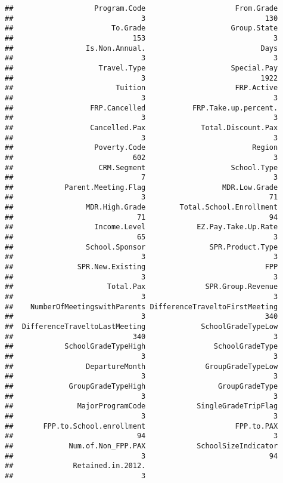 \documentclass[
]{article}
\begin{document}
\begin{verbatim}
##                   Program.Code                     From.Grade 
##                              3                            130 
##                       To.Grade                    Group.State 
##                            153                              3 
##                 Is.Non.Annual.                           Days 
##                              3                              3 
##                    Travel.Type                    Special.Pay 
##                              3                           1922 
##                        Tuition                     FRP.Active 
##                              3                              3 
##                  FRP.Cancelled           FRP.Take.up.percent. 
##                              3                              3 
##                  Cancelled.Pax             Total.Discount.Pax 
##                              3                              3 
##                   Poverty.Code                         Region 
##                            602                              3 
##                    CRM.Segment                    School.Type 
##                              7                              3 
##            Parent.Meeting.Flag                  MDR.Low.Grade 
##                              3                             71 
##                 MDR.High.Grade        Total.School.Enrollment 
##                             71                             94 
##                   Income.Level            EZ.Pay.Take.Up.Rate 
##                             65                              3 
##                 School.Sponsor               SPR.Product.Type 
##                              3                              3 
##               SPR.New.Existing                            FPP 
##                              3                              3 
##                      Total.Pax              SPR.Group.Revenue 
##                              3                              3 
##    NumberOfMeetingswithParents DifferenceTraveltoFirstMeeting 
##                              3                            340 
##  DifferenceTraveltoLastMeeting             SchoolGradeTypeLow 
##                            340                              3 
##            SchoolGradeTypeHigh                SchoolGradeType 
##                              3                              3 
##                 DepartureMonth              GroupGradeTypeLow 
##                              3                              3 
##             GroupGradeTypeHigh                 GroupGradeType 
##                              3                              3 
##               MajorProgramCode            SingleGradeTripFlag 
##                              3                              3 
##       FPP.to.School.enrollment                     FPP.to.PAX 
##                             94                              3 
##             Num.of.Non_FPP.PAX            SchoolSizeIndicator 
##                              3                             94 
##              Retained.in.2012. 
##                              3
\end{verbatim}
\end{document}
